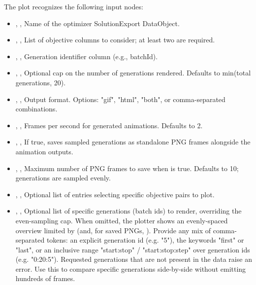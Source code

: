 The  plot recognizes the following input nodes:
\begin{itemize}
  \item {}, , Name of the optimizer SolutionExport DataObject.
  \item {}, , List of objective columns to consider; at least two are required.
  \item {}, , Generation identifier column (e.g., batchId).
  \item {}, , Optional cap on the number of generations rendered. Defaults to min(total generations, 20).
  \item {}, , Output format. Options: "gif", "html", "both", or comma-separated combinations.
  \item {}, , Frames per second for generated animations. Defaults to 2.
  \item {}, , If true, saves sampled generations as standalone PNG frames alongside the animation outputs.
  \item {}, , Maximum number of PNG frames to save when  is true. Defaults to 10; generations are sampled evenly.
  \item {}, , Optional list of  entries selecting specific objective pairs to plot.
  \item {}, , Optional list of specific generations (batch ids) to render, overriding the even-sampling cap. When omitted, the plotter shows an evenly-spaced overview limited by  (and, for saved PNGs, ). Provide any mix of comma-separated tokens: an explicit generation id (e.g. "5"), the keywords "first" or "last", or an inclusive range "start:stop" / "start:stop:step" over generation ids (e.g. "0:20:5"). Requested generations that are not present in the data raise an error. Use this to compare specific generations side-by-side without emitting hundreds of frames.
\end{itemize}
